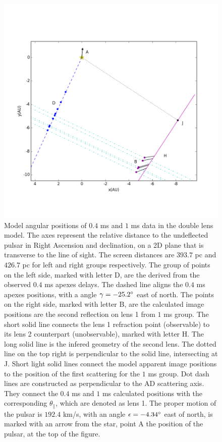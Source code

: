 \documentclass[useAMS,usenatbib]{mn2e}
\begin{document}
\begin{figure}
\centering
\includegraphics[width=1.0\textwidth, angle=0]{Double_lens_xy.png}
\caption{Model angular positions of $0.4$ ms and $1$ ms data in the double
  lens model. The axes represent the relative distance to the undeflected
  pulsar in Right Ascension and declination, on a 2D plane that is transverse to the line of
  sight. The screen distances are $393.7$ pc and $426.7$ pc for left and
  right groups
  respectively. The group of points on the left side, marked with letter
  D, are the derived from the observed $0.4$ ms apexes
  delays. The dashed line aligns the $0.4$ ms apexes
  positions, with a angle $\gamma=-25.2\degree$  east of north. The
  points on the right side, marked with letter B, are the
  calculated image positions are the second reflection on lens 1 from $1$ ms group. The short solid
  line connects the lens 1 refraction point (observable) to its lens 2
  counterpart (unobservable), marked with letter H. The long solid line is the
  infered geometry of the second lens. The dotted line on the top right
  is perpendicular to the solid line, intersecting at J. Short
  light solid lines connect the model apparent image positions to the
  position of the first scattering for the $1$ ms group. Dot dash
  lines are constructed as perpendicular to the 
  AD scattering axis.  They connect the $0.4$
  ms and $1$ ms calculated positions with the corresponding
  $\theta_{\parallel}$, which are denoted as lens 1. The proper
  motion of the pulsar is $192.4$ km/s, with an angle
  $\epsilon=-4.34\degree$ east of north, is marked with an arrow from
  the star, point A the position of the pulsar, at the top of the
  figure.} 
\label{Doublelens}
\end{figure}
\end{document}

